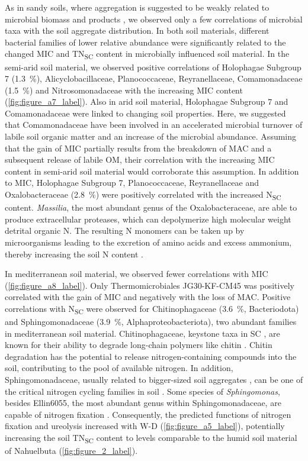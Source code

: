 As in sandy soils, where aggregation is suggested to be weakly related to microbial biomass and products \citep{Degens1996}, we observed only a few correlations of microbial taxa with the soil aggregate distribution. 
In both soil materials, different bacterial families of lower relative abundance were significantly related to the changed MIC and TN\textsubscript{SC} content in microbially influenced soil material. 
In the semi-arid soil material, we observed positive correlations of Holophagae Subgroup 7 (\SI{1.3}{\percent}), Alicyclobacillaceae, Planococcaceae, Reyranellaceae, Comamonadaceae (\SI{1.5}{\percent}) and Nitrosomonadaceae with the increasing MIC content (\cref{fig:figure_a7_label}). 
Also in arid soil material, Holophagae Subgroup 7 and Comamonadaceae were linked to changing soil properties. 
Here, we suggested that Comamonadaceae have been involved in an accelerated microbial turnover of labile soil organic matter and an increase of the microbial abundance. 
Assuming that the gain of MIC partially results from the breakdown of MAC and a subsequent release of labile OM, their correlation with the increasing MIC content in semi-arid soil material would corroborate this assumption. 
In addition to MIC, Holophagae Subgroup 7, Planococcaceae, Reyranellaceae and Oxalobacteraceae (\SI{2.8}{\percent}) were positively correlated with the increased N\textsubscript{SC} content. 
\textit{Massilia}, the most abundant genus of the Oxalobacteraceae, are able to produce extracellular proteases, which can depolymerize high molecular weight detrital organic N. 
The resulting N monomers can be taken up by microorganisms leading to the excretion of amino acids and excess ammonium, thereby increasing the soil N content \citep{Sieradzki2023}.

In mediterranean soil material, we observed fewer correlations with MIC (\cref{fig:figure_a8_label}). 
Only Thermomicrobiales JG30-KF-CM45 was positively correlated with the gain of MIC and negatively with the loss of MAC. 
Positive correlations with N\textsubscript{SC} were observed for Chitinophagaceae (\SI{3.6}{\percent}, Bacteriodota) and Sphingomonadaceae (\SI{3.9}{\percent}, Alphaproteobacteriota), two abundant families in mediterranean soil material. 
Chitinophagaceae, keystone taxa in SC \citep{Feng2022}, are known for their ability to degrade long-chain polymers like chitin \citep{Proenca2017}. 
Chitin degradation has the potential to release nitrogen-containing compounds into the soil, contributing to the pool of available nitrogen. 
In addition, Sphingomonadaceae, usually related to bigger-sized soil aggregates \citep{Feng2022, Yang2019}, can be one of the critical nitrogen cycling families in soil \citep{Wang2020}. 
Some species of \textit{Sphingomonas}, besides Ellin6055, the most abundant genus within Sphingomonadaceae, are capable of nitrogen fixation \citep{Asaf2020}. 
Consequently, the predicted functions of nitrogen fixation and ureolysis increased with W-D (\cref{fig:figure_a5_label}), potentially increasing the soil TN\textsubscript{SC} content to levels comparable to the humid soil material of Nahuelbuta (\cref{fig:figure_2_label}).

